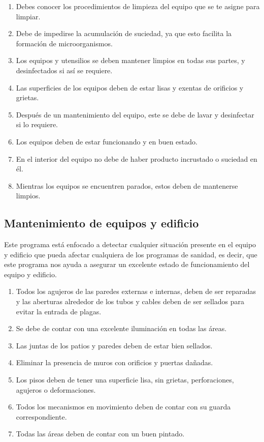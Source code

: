 \begin{enumerate}
	\item Debes conocer los procedimientos de limpieza del equipo que se te asigne para limpiar.
	\item Debe de impedirse la acumulación de suciedad, ya que esto facilita la formación de microorganismos.
	\item Los equipos y utensilios se deben mantener limpios en todas sus partes, y desinfectados si así se requiere.
	\item Las superficies de los equipos deben de estar lisas y exentas de orificios y grietas.
	\item Después de un mantenimiento del equipo, este se debe de lavar y desinfectar si lo requiere.
	\item Los equipos deben de estar funcionando y en buen estado.
	\item En el interior del equipo no debe de haber producto incrustado o suciedad en él.
	\item Mientras los equipos se encuentren parados, estos deben de mantenerse limpios.
\end{enumerate}

\subsection{Mantenimiento de equipos y edificio}
Este programa está enfocado a detectar cualquier situación presente en el equipo y edificio que pueda afectar cualquiera de los programas de sanidad, es decir, que este programa nos ayuda a asegurar un excelente estado de funcionamiento del equipo y edificio.

\begin{enumerate}
	\item Todos los agujeros de las paredes externas e internas, deben de ser reparadas y las aberturas alrededor de los tubos y cables deben de ser sellados para evitar la entrada de plagas.
	\item Se debe de contar con una excelente iluminación en todas las áreas.
	\item Las juntas de los patios y paredes deben de estar bien sellados.
	\item Eliminar la presencia de muros con orificios y puertas dañadas.
	\item Los pisos deben de tener una superficie lisa, sin grietas, perforaciones, agujeros o deformaciones.
	\item Todos los mecanismos en movimiento deben de contar con su guarda correspondiente.
	\item Todas las áreas deben de contar con un buen pintado.
\end{enumerate}

